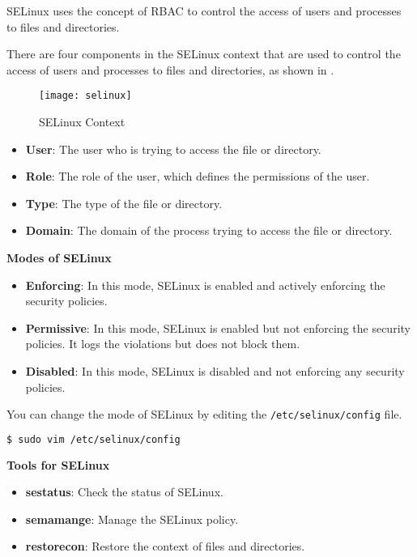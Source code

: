 SELinux uses the concept of RBAC to control the access
of users and processes to files and directories.

There are four components in the SELinux context
that are used to control the access of users and
processes to files and directories, as shown in
.

\begin{figure}[h!]
  \texttt{[image: selinux]}
  \caption{SELinux Context}
\end{figure}

\begin{itemize}
  \item \textbf{User}: The user who is trying to access
    the file or directory.
  \item \textbf{Role}: The role of the user, which defines
    the permissions of the user.
  \item \textbf{Type}: The type of the file or directory.
  \item \textbf{Domain}: The domain
    of the process trying to access the file or directory.
\end{itemize}

\textbf{Modes of SELinux}

\begin{itemize}
  \item \textbf{Enforcing}: In this mode, SELinux is enabled
    and actively enforcing the security policies.
  \item \textbf{Permissive}: In this mode, SELinux is enabled
    but not enforcing the security policies. It logs the
    violations but does not block them.
  \item \textbf{Disabled}: In this mode, SELinux is disabled
    and not enforcing any security policies.
\end{itemize}

You can change the mode of SELinux by editing the
\lstinline|/etc/selinux/config| file.

\begin{lstlisting}[language=bash]
$ sudo vim /etc/selinux/config
\end{lstlisting}

\textbf{Tools for SELinux}

\begin{itemize}
  \item \textbf{sestatus}: Check the status of SELinux.
  \item \textbf{semamange}: Manage the SELinux policy.
  \item \textbf{restorecon}: Restore the context of files
    and directories.
\end{itemize}


